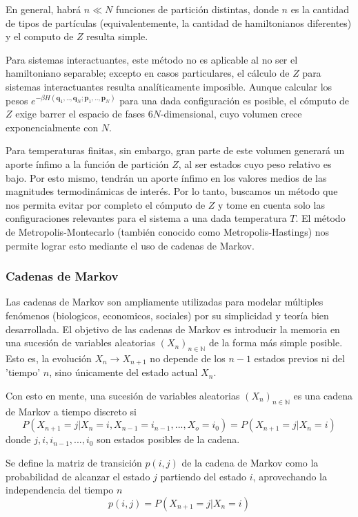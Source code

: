 En general, habrá $n\ll N$ funciones de partición distintas, donde $n$ es la cantidad de tipos de partículas (equivalentemente, la cantidad de hamiltonianos diferentes) y el computo de $Z$ resulta simple.

Para sistemas interactuantes, este método no es aplicable al no ser el hamiltoniano separable; excepto en casos particulares, el cálculo de $Z$ para sistemas interactuantes resulta analíticamente imposible. 
Aunque calcular los pesos $e^{-\beta H(\mathbf{q}_1,..,\mathbf{q}_N;\mathbf{p}_1,..,\mathbf{p}_N)}$ para una dada configuración es posible, el cómputo de $Z$ exige barrer el espacio de fases $6N$-dimensional, 
cuyo volumen crece exponencialmente con $N$.

Para temperaturas finitas, sin embargo, gran parte de este volumen generará un aporte ínfimo a la función de partición $Z$, al ser estados cuyo peso relativo es bajo. 
Por esto mismo, tendrán un aporte ínfimo en los valores medios de las magnitudes termodinámicas de interés. 
Por lo tanto, buscamos un método que nos permita evitar por completo el cómputo de $Z$ y tome en cuenta solo las configuraciones relevantes para el sistema a una dada temperatura $T$.
El método de Metropolis-Montecarlo (también conocido como Metropolis-Hastings) nos permite lograr esto mediante el uso de cadenas de Markov.

\subsubsection{Cadenas de Markov}

Las cadenas de Markov son ampliamente utilizadas para modelar múltiples fenómenos (biologicos, economicos, sociales) por su simplicidad y teoría bien desarrollada.
El objetivo de las cadenas de Markov es introducir la memoria en una sucesión de variables aleatorias $(X_n)_{n\in \mathbb{N}}$ de la forma más simple posible.
Esto es, la evolución $X_n \to X_{n+1}$ no depende de los $n-1$ estados previos ni del 'tiempo' $n$, sino únicamente del estado actual $X_n$.

Con esto en mente, una sucesión de variables aleatorias $(X_n)_{n\in \mathbb{N}}$ es una cadena de Markov a tiempo discreto si
\[ P(X_{n+1}=j | X_n = i, X_{n-1} = i_{n-1}, ..., X_o = i_0) = P(X_{n+1}=j | X_n = i)  \]
donde $j, i, i_{n-1}, ..., i_0$ son estados posibles de la cadena. 

Se define la matriz de transición $p(i,j)$ de la cadena de Markov como la probabilidad de alcanzar el estado $j$ partiendo del estado $i$, aprovechando la independencia del tiempo $n$
\[ p(i,j) = P(X_{n+1} = j | X_n = i) \]

